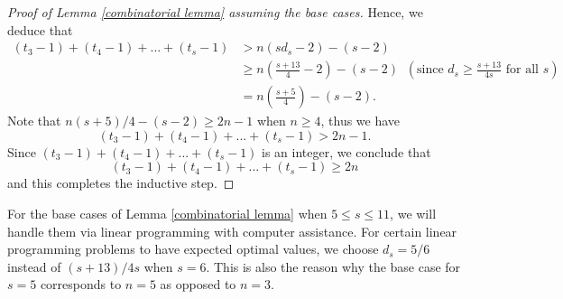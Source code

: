 \documentclass[11pt]{amsart}
\theoremstyle{plain} %
\theoremstyle{remark}
\numberwithin{equation}{section}
\begin{document}
\begin{proof}[Proof of Lemma \ref{combinatorial lemma} assuming the base cases]
    Hence, we deduce that
    \begin{equation*}
        \begin{split}
            (t_3-1)+(t_4-1)+...+(t_s-1)&>n(sd_s-2)-(s-2)\\
            &\geq n\left(\frac{s+13}{4}-2\right)-(s-2)\;\;\left(\text{since $d_s\geq \frac{s+13}{4s}$ for all $s$}\right)\\
            &=n\left(\frac{s+5}{4}\right)-(s-2).
        \end{split}
    \end{equation*}
    Note that $n(s+5)/4-(s-2)\geq 2n-1$ when $n\geq 4$, thus we have
    \begin{equation*}
        (t_3-1)+(t_4-1)+...+(t_s-1)>2n-1.
    \end{equation*}
    Since $(t_3-1)+(t_4-1)+...+(t_s-1)$ is an integer, we conclude that
    \begin{equation*}
        (t_3-1)+(t_4-1)+...+(t_s-1)\geq 2n
    \end{equation*}
    and this completes the inductive step.
\end{proof}

For the base cases of Lemma \ref{combinatorial lemma} when $5\leq s\leq 11$, we will handle them via linear programming with computer assistance. For certain linear programming problems to have expected optimal values, we choose $d_s=5/6$ instead of $(s+13)/4s$ when $s=6$. This is also the reason why the base case for $s=5$ corresponds to $n=5$ as opposed to $n=3$.
\end{document}
